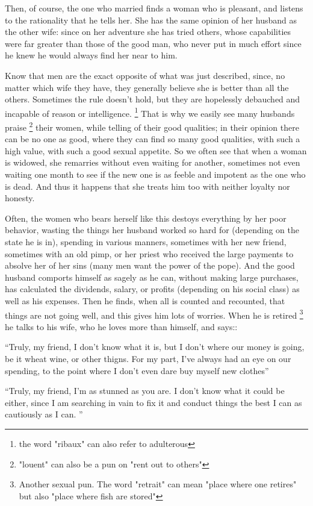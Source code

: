\documentclass{book}
\begin{document}
Then, of course, the one who married finds a woman who is pleasant, and listens to the rationality that he tells her. She has the same opinion of her husband as the other wife: since on her adventure she has tried others, whose capabilities were far greater than those of the good man, who never put in much effort since he knew he would always find her near to him. 

Know that men are the exact opposite of what was just described, since, no matter which wife they have, they generally believe she is better than all the others. Sometimes the rule doesn't hold, but they are hopelessly debauched and incapable of reason or intelligence.
\footnote{the word "ribaux" can also refer to adulterous}
That is why we easily see many husbands praise
\footnote{"louent" can also be a pun on "rent out to others"}
their women, while telling of their good qualities; in their opinion there can be no one as good, where they can find so many good qualities, with such a high value, with such a good sexual appetite. So we often see that when a woman is widowed, she remarries without even waiting for another, sometimes not even waiting one month to see if the new one is as feeble and impotent as the one who is dead. And thus it happens that she treats him too with neither loyalty nor honesty. 

Often, the women who bears herself like this destoys everything by her poor behavior, wasting the things her husband worked so hard for (depending on the state he is in), spending in various manners, sometimes with her new friend, sometimes with an old pimp, or her priest who received the large payments to absolve her of her sins (many men want the power of the pope). And the good husband comports himself as sagely as he can, without making large purchases, has calculated the dividends, salary, or profits (depending on his social class) as well as his expenses. Then he finds, when all is counted and recounted, that things are not going well, and this gives him lots of worries. When he is retired
\footnote{Another sexual pun. The word "retrait" can mean "place where one retires" but also "place where fish are stored"}
he talks to his wife, who he loves more than himself, and says::

``Truly, my friend, I don't know what it is, but I don't where our money is going, be it wheat wine, or other thigns. For my part, I've always had an eye on our spending, to the point where I don't even dare buy myself new clothes''

``Truly, my friend, I'm as stunned as you are. I don't know what it could be either, since I am searching in vain to fix it and conduct things the best I can as cautiously as I can. ''
\end{document}
